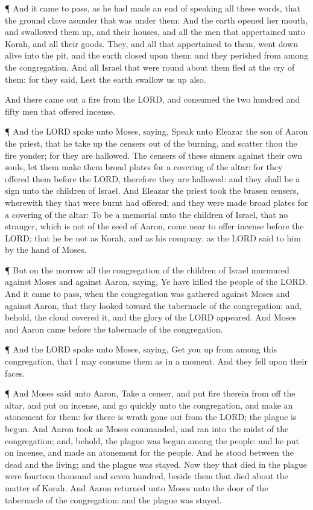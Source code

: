  ¶ And it came to pass, as he had made an end of speaking
all these words, that the ground clave asunder that was under them:
 And the earth opened her mouth, and swallowed them up, and
their houses, and all the men that appertained unto Korah, and all their
goods.  They, and all that appertained to them, went down
alive into the pit, and the earth closed upon them: and they perished
from among the congregation.  And all Israel that were
round about them fled at the cry of them: for they said, Lest the earth
swallow us up also.

 And there came out a fire from the LORD, and consumed the
two hundred and fifty men that offered incense.

 ¶ And the LORD spake unto Moses, saying, 
Speak unto Eleazar the son of Aaron the priest, that he take up the
censers out of the burning, and scatter thou the fire yonder; for they
are hallowed.  The censers of these sinners against their
own souls, let them make them broad plates for a covering of the altar:
for they offered them before the LORD, therefore they are hallowed: and
they shall be a sign unto the children of Israel.  And
Eleazar the priest took the brasen censers, wherewith they that were
burnt had offered; and they were made broad plates for a covering of the
altar:  To be a memorial unto the children of Israel, that
no stranger, which is not of the seed of Aaron, come near to offer
incense before the LORD; that he be not as Korah, and as his company: as
the LORD said to him by the hand of Moses.

 ¶ But on the morrow all the congregation of the children
of Israel murmured against Moses and against Aaron, saying, Ye have
killed the people of the LORD.  And it came to pass, when
the congregation was gathered against Moses and against Aaron, that they
looked toward the tabernacle of the congregation: and, behold, the cloud
covered it, and the glory of the LORD appeared.  And Moses
and Aaron came before the tabernacle of the congregation.

 ¶ And the LORD spake unto Moses, saying,  Get
you up from among this congregation, that I may consume them as in a
moment. And they fell upon their faces.

 ¶ And Moses said unto Aaron, Take a censer, and put fire
therein from off the altar, and put on incense, and go quickly unto the
congregation, and make an atonement for them: for there is wrath gone
out from the LORD; the plague is begun.  And Aaron took as
Moses commanded, and ran into the midst of the congregation; and,
behold, the plague was begun among the people: and he put on incense,
and made an atonement for the people.  And he stood between
the dead and the living; and the plague was stayed.  Now
they that died in the plague were fourteen thousand and seven hundred,
beside them that died about the matter of Korah.  And Aaron
returned unto Moses unto the door of the tabernacle of the congregation:
and the plague was stayed.

